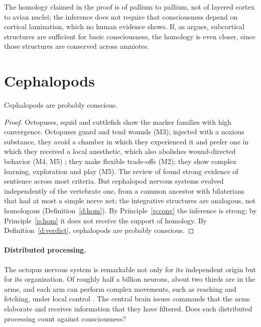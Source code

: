 \documentclass{situationist-preprint}
\begin{document}
The homology claimed in the proof is of pallium to pallium, not of layered cortex to avian nuclei; the inference does not require that consciousness depend on cortical lamination, which no human evidence shows. If, as \citet{Merker2007} argues, subcortical structures are sufficient for basic consciousness, the homology is even closer, since those structures are conserved across amniotes.

\section{Cephalopods}

\begin{lemma}\label{l:ceph}
Cephalopods are probably conscious.
\end{lemma}

\begin{proof}
Octopuses, squid and cuttlefish show the marker families with high convergence. Octopuses guard and tend wounds (M3); injected with a noxious substance, they avoid a chamber in which they experienced it and prefer one in which they received a local anesthetic, which also abolishes wound-directed behavior (M4, M5) \citep{Crook2021}; they make flexible trade-offs (M2); they show complex learning, exploration and play \citep{Mather2008} (M5). The review of \citet{Birch2021} found strong evidence of sentience across most criteria. But cephalopod nervous systems evolved independently of the vertebrate one, from a common ancestor with bilaterians that had at most a simple nerve net; the integrative structures are analogous, not homologous (Definition~\ref{d:hom}). By Principle~\ref{p:conv} the inference is strong; by Principle~\ref{p:hom} it does not receive the support of homology. By Definition~\ref{d:verdict}, cephalopods are probably conscious.
\end{proof}

\paragraph{Distributed processing.} The octopus nervous system is remarkable not only for its independent origin but for its organization. Of roughly half a billion neurons, about two thirds are in the arms, and each arm can perform complex movements, such as reaching and fetching, under local control \citep{Hochner2012,GodfreySmith2016}. The central brain issues commands that the arms elaborate and receives information that they have filtered. Does such distributed processing count against consciousness?
\end{document}
